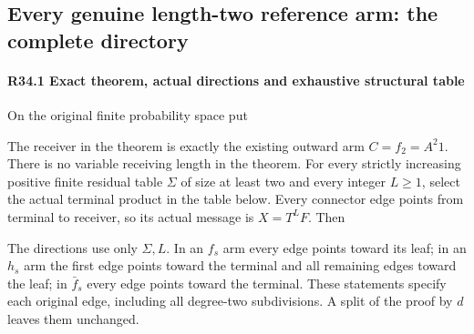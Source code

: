 \subsection{Every genuine length-two reference arm: the complete directory}\label{proof:R2-C034}
\paragraph{R34.1 Exact theorem, actual directions and exhaustive structural table}

On the original finite probability space put


The receiver in the theorem is exactly the existing outward arm
\(C=f_2=A^2 1\). There is no variable receiving length in the theorem.
For every strictly increasing positive finite residual table \(\Sigma\) of
size at least two and every integer \(L\ge1\), select the actual terminal
product in the table below. Every connector edge points from terminal to
receiver, so its actual message is \(X=T^LF\). Then


The directions use only \(\Sigma,\allowbreak  L\). In an \(f_s\) arm every edge points
toward its leaf; in an \(h_s\) arm the first edge points toward the terminal
and all remaining edges toward the leaf; in \(\bar f_s\) every edge points toward
the terminal. These statements specify each original edge, including all
degree-two subdivisions. A split of the proof by \(d\) leaves them unchanged.

